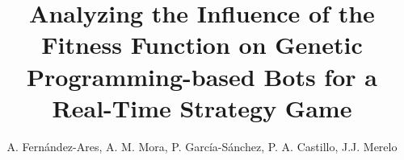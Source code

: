 \documentclass[preprint]{elsarticle}
\begin{document}
\begin{frontmatter}


\title{Analyzing the Influence of the Fitness Function on Genetic Programming-based Bots for a Real-Time Strategy Game}


\author{A. Fern{\'a}ndez-Ares, A. M. Mora, P. Garc{\'i}a-S{\'a}nchez, P. A. Castillo, J.J. Merelo}
\address{Departamento de Arquitectura y Tecnología de Computadores.\\ ETSIIT - CITIC. University of Granada, Spain}



\end{frontmatter}
\end{document}
